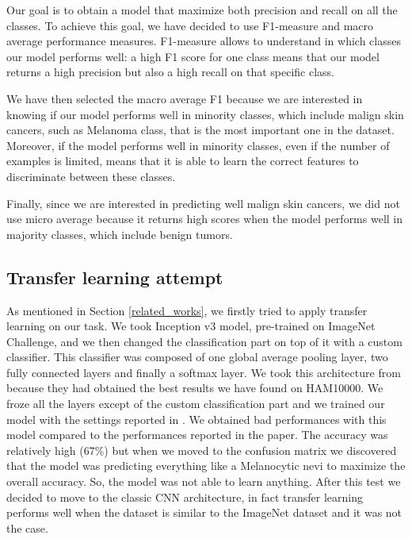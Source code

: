 		\smallskip
		
		Our goal is to obtain a model that maximize both precision and recall on all the classes.
		To achieve this goal, we have decided to use F1-measure and macro average performance measures. F1-measure allows to understand in which classes our model performs well: a high F1 score for one class means that our model returns a high precision but also a high recall on that specific class. 
		
		\smallskip
		
		We have then selected the macro average F1 because we are interested in knowing if our model performs well in minority classes, which include malign skin cancers, such as Melanoma class, that is the most important one in the dataset. 
		Moreover, if the model performs well in minority classes, even if the number of examples is limited, means that it is able to learn the correct features to discriminate between these classes. 
		
		\smallskip
		
		Finally, since we are interested in predicting well malign skin cancers, we did not use micro average because it returns high scores when the model performs well in majority classes, which include benign tumors.
		
	\subsection{Transfer learning attempt}
		
		As mentioned in Section \ref{related_works}, we firstly tried to apply transfer learning on our task. We took Inception v3 model, pre-trained on ImageNet Challenge, and we then changed the classification part on top of it with a custom classifier. This classifier was composed of one global average pooling layer, two fully connected layers and finally a softmax layer. We took this architecture from \cite{article2} because they had obtained the best results we have found on HAM10000. We froze all the layers except of the custom classification part and we trained our model with the settings reported in \cite{article2}. We obtained bad performances with this model compared to the performances reported in the paper. The accuracy was relatively high (67\%) but when we moved to the confusion matrix we discovered that the model was predicting everything like a Melanocytic nevi to maximize the overall accuracy. So, the model was not able to learn anything. After this test we decided to move to the classic CNN architecture, in fact transfer learning performs well when the dataset is similar to the ImageNet dataset and it was not the case.
		
